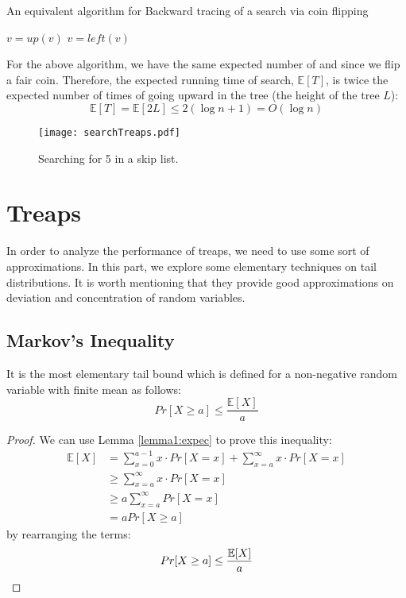 \documentclass[11pt]{article}
\begin{document}
\begin{algorithm}[H]
\caption{An equivalent algorithm for Backward tracing of a search via coin flipping}\label{skiplist2}
\begin{algorithmic}[1]
    \State $v=up(v)$
    \Else 
    \State $v = left(v)$
    \EndIf
\EndWhile
\EndFunction
\end{algorithmic}
\end{algorithm}
For the above algorithm, we have the same expected number of  and  since we flip a fair coin. Therefore, the expected running time of search, $\mathbb{E}[T]$, is twice the expected number of times of going upward in the tree (the height of the tree $L$):
\begin{equation*}
    \mathbb{E}[T] = \mathbb{E}[2L] \leq 2(\log n +1) = O(\log n)
\end{equation*}

\begin{figure}[H]
\begin{center}
    
  \texttt{[image: searchTreaps.pdf]}
  \vspace{-0.1in}
  \caption{\label{search.fig}Searching for 5 in a skip list.}
  \label{fig:backward}
\end{center}
\end{figure}



\section{Treaps}
In order to analyze the performance of treaps, we need to use some sort of approximations. In this part, we explore some elementary techniques on tail distributions. It is worth mentioning that they provide good approximations on deviation and concentration of random variables.

\subsection{Markov's Inequality}
It is the most elementary tail bound which is defined for a non-negative random variable with finite mean as follows:
\begin{equation*}
    Pr[X \geq a] \leq \frac{\mathbb{E}[X]}{a}
\end{equation*}
\begin{proof}
 We can use Lemma \ref{lemma1:expec} to prove this inequality:
\begin{align*}
    \mathbb{E}[X] &= \sum_{x=0}^{a-1} x \cdot Pr[X=x] + \sum_{x=a}^{\infty} x \cdot Pr[X=x]\\
    &\geq \sum_{x=a}^{\infty} x \cdot Pr[X=x]\\
    & \geq a \sum_{x=a}^{\infty} Pr[X=x]\\
    & = a Pr[X \geq a]
\end{align*}
by rearranging the terms:
    $$Pr[X \geq a] \leq \frac{\mathbb{E}[X]}{a} \qedhere$$ 
\end{proof}
\end{document}
